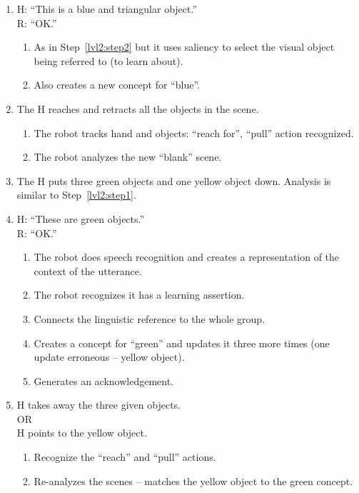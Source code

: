 \documentclass{article}
\begin{document}
\begin{enumerate}
\item \label{lvl2:step4} 
  H: ``This is a blue and triangular object.''\\
  R: ``OK.''
  \begin{enumerate}
  \item \label{lvl2:step4:detail1} As in Step~\ref{lvl2:step2} but it
    uses saliency to select the visual object being referred to (to
    learn about).
  \item \label{lvl2:step4:detail2} Also creates a new concept for
    ``blue''.
  \end{enumerate}

\item \label{lvl2:step5} The H reaches and retracts all the objects in
  the scene.
  \begin{enumerate}
  \item \label{lvl2:step5:detail1} The robot tracks hand and objects:
    ``reach for'', ``pull'' action recognized.
  \item \label{lvl2:step5:detail2} The robot analyzes the new
    ``blank'' scene.
  \end{enumerate}

\item \label{lvl2:step6} The H puts three green objects and one yellow
  object down.
  Analysis is similar to Step~\ref{lvl2:step1}.

\item \label{lv2:step7}
  H: ``These are green objects.''\\
  R: ``OK.''
  \begin{enumerate}
  \item \label{lvl2:step7:detail1} The robot does speech recognition
    and creates a representation of the context of the utterance.
  \item \label{lvl2:step7:detail2} The robot recognizes it has a
    learning assertion.
  \item \label{lvl2:step7:detail3} Connects the linguistic reference
    to the whole group.
  \item \label{lvl2:step7:detail4} Creates a concept for ``green'' and
    updates it three more times (one update erroneous -- yellow
    object).
  \item \label{lvl2:step7:detail5} Generates an acknowledgement.
  \end{enumerate}
  
\item \label{lvl2:step8} 
  H takes away the three given objects. \\
  OR \\
  H points to the yellow object.
  \begin{enumerate}
  \item \label{lvl2:step8a:detail1} Recognize the ``reach'' and
    ``pull'' actions.
  \item \label{lvl2:step8a:detail2} Re-analyzes the scenes -- matches
    the yellow object to the green concept.
  \end{enumerate}


\end{enumerate}
\end{document}
